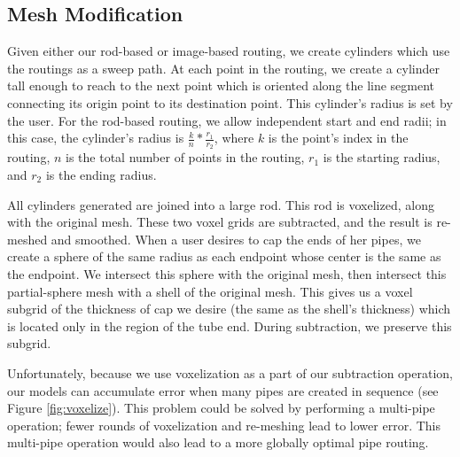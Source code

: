 
\subsection{Mesh Modification}

Given either our rod-based or image-based routing, we create cylinders which use the routings as a sweep path.  At each point in the routing, we create a cylinder tall enough to reach to the next point which is oriented along the line segment connecting its origin point to its destination point.  This cylinder's radius is set by the user.  For the rod-based routing, we allow independent start and end radii; in this case, the cylinder's radius is $\frac{k}{n}*\frac{r_1}{r_2}$, where $k$ is the point's index in the routing, $n$ is the total number of points in the routing, $r_1$ is the starting radius, and $r_2$ is the ending radius.

All cylinders generated are joined into a large rod.  This rod is voxelized, along with the original mesh.  These two voxel grids are subtracted, and the result is re-meshed and smoothed.  When a user desires to cap the ends of her pipes, we create a sphere of the same radius as each endpoint whose center is the same as the endpoint.  We intersect this sphere with the original mesh, then intersect this partial-sphere mesh with a shell of the original mesh.  This gives us a voxel subgrid of the thickness of cap we desire (the same as the shell's thickness) which is located only in the region of the tube end.  During subtraction, we preserve this subgrid. 

Unfortunately, because we use voxelization as a part of our subtraction operation, our models can accumulate error when many pipes are created in sequence (see Figure \ref{fig:voxelize}).  This problem could be solved by performing a multi-pipe operation; fewer rounds of voxelization and re-meshing lead to lower error.  This multi-pipe operation would also lead to a more globally optimal pipe routing.

